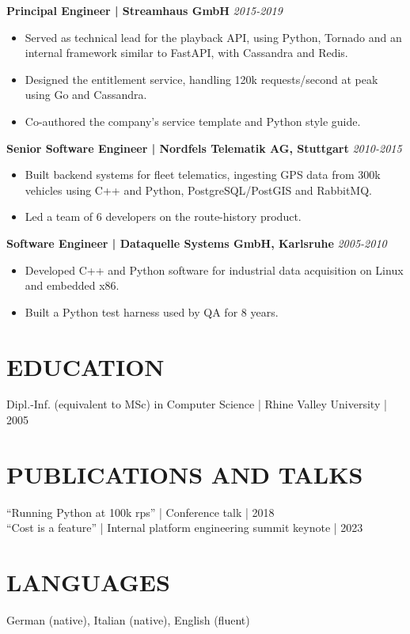 \documentclass[11pt,a4paper]{article}
\begin{document}
\textbf{Principal Engineer | Streamhaus GmbH} \hfill \textit{2015-2019}
\begin{itemize}
\item Served as technical lead for the playback API, using Python, Tornado and an internal framework similar to FastAPI, with Cassandra and Redis.
\item Designed the entitlement service, handling 120k requests/second at peak using Go and Cassandra.
\item Co-authored the company’s service template and Python style guide.
\end{itemize}

\textbf{Senior Software Engineer | Nordfels Telematik AG, Stuttgart} \hfill \textit{2010-2015}
\begin{itemize}
\item Built backend systems for fleet telematics, ingesting GPS data from 300k vehicles using C++ and Python, PostgreSQL/PostGIS and RabbitMQ.
\item Led a team of 6 developers on the route-history product.
\end{itemize}

\textbf{Software Engineer | Dataquelle Systems GmbH, Karlsruhe} \hfill \textit{2005-2010}
\begin{itemize}
\item Developed C++ and Python software for industrial data acquisition on Linux and embedded x86.
\item Built a Python test harness used by QA for 8 years.
\end{itemize}

\section*{EDUCATION}
Dipl.-Inf. (equivalent to MSc) in Computer Science | Rhine Valley University | 2005

\section*{PUBLICATIONS AND TALKS}
“Running Python at 100k rps” | Conference talk | 2018\\
“Cost is a feature” | Internal platform engineering summit keynote | 2023

\section*{LANGUAGES}
German (native), Italian (native), English (fluent)
\end{document}
